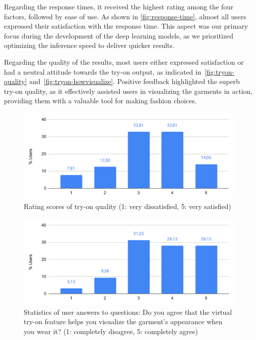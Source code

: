 Regarding the response times, it received the highest rating among the four factors, followed by ease of use.  As shown in \autoref{fig:response-time}, almost all users expressed their satisfaction with the response time. This aspect was our primary focus during the development of the deep learning models, as we prioritized optimizing the inference speed to deliver quicker results.

Regarding the quality of the results, most users either expressed satisfaction or had a neutral attitude towards the try-on output, as indicated in~\autoref{fig:tryon-quality} and~\autoref{fig:tryon-howvisualize}. Positive feedback highlighted the superb try-on quality, as it effectively assisted users in visualizing the garments in action, providing them with a valuable tool for making fashion choices.

\begin{figure}[h!]
  \centering
  \includegraphics[width=0.8\linewidth]{content/resources/images/application/exp-user-tryon-quality.pdf}
  \caption{Rating scores of try-on quality (1: very dissatisfied, 5: very satisfied)}
  \label{fig:tryon-quality}
\end{figure}

\begin{figure}[h!]
  \centering
  \includegraphics[width=0.8\linewidth]{content/resources/images/application/exp-user-tryon-howvisualize.pdf}
  \caption{Statistics of user answers to questions: Do you agree that the virtual try-on feature helps you visualize the garment's appearance when you wear it? (1: completely disagree, 5: completely agree)}
  \label{fig:tryon-howvisualize}
\end{figure}

